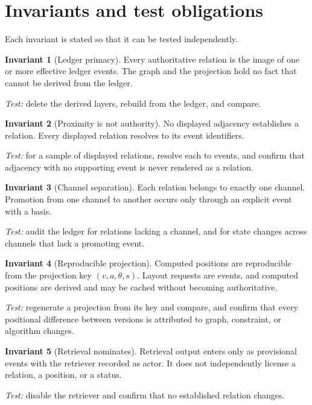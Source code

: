 \documentclass[11pt]{article}
\theoremstyle{definition}
\newtheorem{invariant}{Invariant}
\begin{document}
\section{Invariants and test obligations}

Each invariant is stated so that it can be tested independently.

\begin{invariant}[Ledger primacy]
Every authoritative relation is the image of one or more effective ledger events. The graph and the projection hold no fact that cannot be derived from the ledger.
\end{invariant}
\noindent\emph{Test:} delete the derived layers, rebuild from the ledger, and compare.

\begin{invariant}[Proximity is not authority]
No displayed adjacency establishes a relation. Every displayed relation resolves to its event identifiers.
\end{invariant}
\noindent\emph{Test:} for a sample of displayed relations, resolve each to events, and confirm that adjacency with no supporting event is never rendered as a relation.

\begin{invariant}[Channel separation]
Each relation belongs to exactly one channel. Promotion from one channel to another occurs only through an explicit event with a basis.
\end{invariant}
\noindent\emph{Test:} audit the ledger for relations lacking a channel, and for state changes across channels that lack a promoting event.

\begin{invariant}[Reproducible projection]
Computed positions are reproducible from the projection key $(v, a, \theta, s)$. Layout requests are events, and computed positions are derived and may be cached without becoming authoritative.
\end{invariant}
\noindent\emph{Test:} regenerate a projection from its key and compare, and confirm that every positional difference between versions is attributed to graph, constraint, or algorithm changes.

\begin{invariant}[Retrieval nominates]
Retrieval output enters only as provisional events with the retriever recorded as actor. It does not independently license a relation, a position, or a status.
\end{invariant}
\noindent\emph{Test:} disable the retriever and confirm that no established relation changes.
\end{document}
